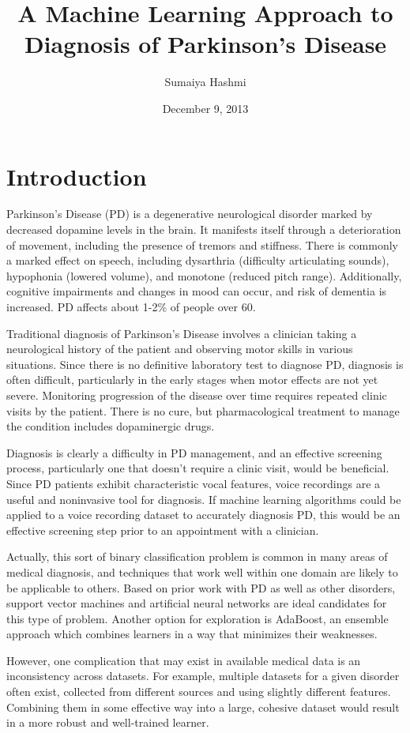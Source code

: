 \documentclass[draftcopy]{srpaper}
\title{A Machine Learning Approach to Diagnosis of Parkinson's Disease}
\author{Sumaiya Hashmi}
\date{December 9, 2013}
\begin{document}
\frontmatter
\chapter{Introduction}
\label{Chapter:One}
Parkinson's Disease (PD) is a degenerative neurological disorder
marked by decreased dopamine levels in the brain. It manifests itself
through a deterioration of movement,
including the presence of tremors and stiffness. There is commonly a
marked effect on speech, including dysarthria (difficulty articulating
sounds), hypophonia (lowered volume), and monotone (reduced pitch
range). Additionally, 
cognitive impairments and changes in mood can occur, and risk of
dementia is increased. PD affects about
1-2\% of people over 60.

Traditional diagnosis of Parkinson's Disease involves a clinician taking a
neurological history of the patient and observing motor skills in
various situations. Since there is no definitive laboratory test to
diagnose PD, diagnosis is often difficult, particularly in the early
stages when motor effects are not yet severe. Monitoring progression of the disease over time requires repeated clinic visits by the patient. There is no cure, but pharmacological treatment to
manage the condition includes dopaminergic drugs. 

Diagnosis is clearly a difficulty in PD management, and an effective
screening process, particularly one that doesn't require a clinic
visit, would be beneficial. Since PD patients exhibit characteristic
vocal features, voice recordings are a useful and noninvasive tool for
diagnosis. If machine learning algorithms could be applied to a voice recording
dataset to accurately diagnosis PD, this would be an effective screening step prior to an
appointment with a clinician.

Actually, this sort of binary classification problem is common
in many areas of medical diagnosis, and techniques that work well
within one domain are likely to be applicable to others. Based on
prior work with PD as well as other disorders, support vector machines
and artificial neural networks are ideal candidates for this type of
problem. Another option for exploration is AdaBoost, an ensemble
approach which combines learners in a way that minimizes their weaknesses. 

However, one
complication that may exist in available medical data is an
inconsistency across datasets. For example, multiple datasets for a given
disorder often exist, collected from different sources and using
slightly different features. Combining them in some effective way into
a large, cohesive dataset would result in a more robust and
well-trained learner. 
\end{document}
